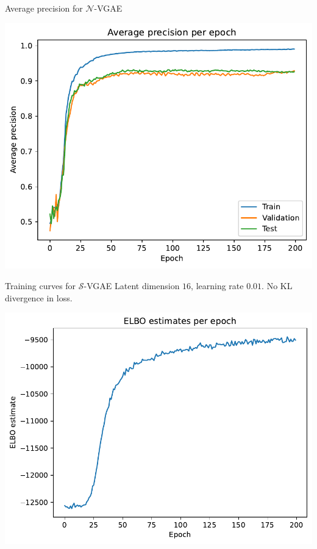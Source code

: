 \begin{frame}{Average precision for $\mathcal{N}$-VGAE}
  \begin{center}
    \includegraphics[width=.8\hsize]{figures/normal_ap.pdf}
  \end{center}
\end{frame}

\begin{frame}{Training curves for $\mathcal{S}$-VGAE}
  Latent dimension $16$, learning rate $0.01$. No KL divergence in loss.
  \begin{center}
    \includegraphics[width=.8\hsize]{figures/vMF_elbo_estimates.pdf}
  \end{center}
\end{frame}

